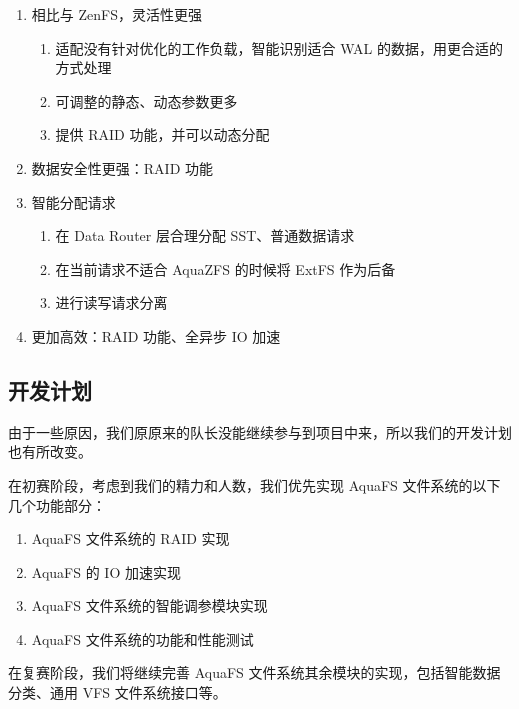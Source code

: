 \begin{enumerate}
    \item 相比与 ZenFS，灵活性更强
    \begin{enumerate}
        \item 适配没有针对优化的工作负载，智能识别适合 WAL 的数据，用更合适的方式处理
        \item 可调整的静态、动态参数更多
        \item 提供 RAID 功能，并可以动态分配
    \end{enumerate}
    \item 数据安全性更强：RAID 功能
    \item 智能分配请求
    \begin{enumerate}
        \item 在 Data Router 层合理分配 SST、普通数据请求
        \item 在当前请求不适合 AquaZFS 的时候将 ExtFS 作为后备
        \item 进行读写请求分离
    \end{enumerate}
    \item 更加高效：RAID 功能、全异步 IO 加速
\end{enumerate}

\subsection{开发计划}

由于一些原因，我们原原来的队长没能继续参与到项目中来，所以我们的开发计划也有所改变。

在初赛阶段，考虑到我们的精力和人数，我们优先实现 AquaFS 文件系统的以下几个功能部分：

\begin{enumerate}
  \item AquaFS 文件系统的 RAID 实现
  \item AquaFS 的 IO 加速实现
  \item AquaFS 文件系统的智能调参模块实现
  \item AquaFS 文件系统的功能和性能测试
\end{enumerate}

在复赛阶段，我们将继续完善 AquaFS 文件系统其余模块的实现，包括智能数据分类、通用 VFS 文件系统接口等。